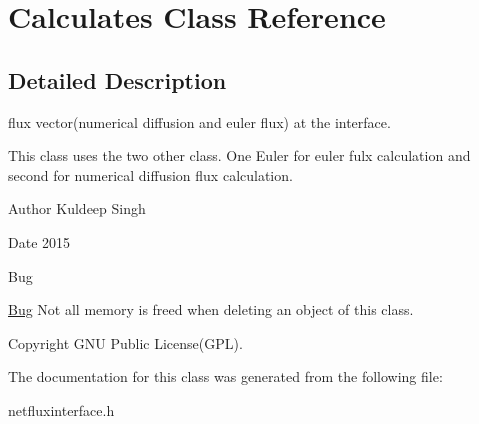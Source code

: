 \hypertarget{classCalculates}{}\section{Calculates Class Reference}
\label{classCalculates}


\subsection{Detailed Description}
flux vector(numerical diffusion and euler flux) at the interface.

This class uses the two other class. One Euler for euler fulx calculation and second for numerical diffusion flux calculation. \begin{DoxyAuthor}{Author}
Kuldeep Singh 
\end{DoxyAuthor}
\begin{DoxyDate}{Date}
2015 
\end{DoxyDate}
\begin{DoxyRefDesc}{Bug}
\item[\hyperlink{bug__bug000009}{Bug}]Not all memory is freed when deleting an object of this class. \end{DoxyRefDesc}
\begin{DoxyCopyright}{Copyright}
G\+NU Public License(\+G\+P\+L). 
\end{DoxyCopyright}


The documentation for this class was generated from the following file\+:\begin{DoxyCompactItemize}
\item 
netfluxinterface.\+h\end{DoxyCompactItemize}

